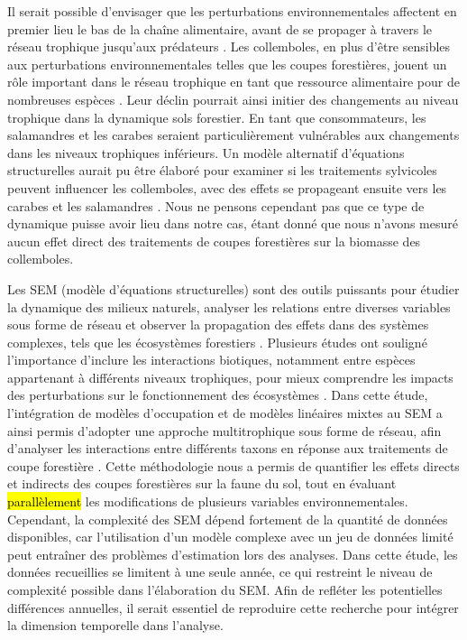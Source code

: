 Il serait possible d'envisager que les perturbations environnementales affectent en premier lieu le bas de la chaîne alimentaire, avant de se propager à travers le réseau trophique jusqu'aux prédateurs \citep{Chauvat2014Responsesoil,Laigle2021Directindirect}. 
Les collemboles, en plus d'être sensibles aux perturbations environnementales telles que les coupes forestières, jouent un rôle important dans le réseau trophique en tant que ressource alimentaire pour de nombreuses espèces \citep{Burton1975Energyflow,Bauer1982Predationcarabid,rusekBiodiversityCollembolaTheir1998,Chauvat2014Responsesoil}. 
Leur déclin pourrait ainsi initier des changements au niveau trophique dans la dynamique sols forestier.
En tant que consommateurs, les salamandres et les carabes seraient particulièrement vulnérables aux changements dans les niveaux trophiques inférieurs. 
Un modèle alternatif d'équations structurelles aurait pu être élaboré pour examiner si les traitements sylvicoles peuvent influencer les collemboles, avec des effets se propageant ensuite vers les carabes et les salamandres \citep{Laigle2021Directindirect}. 
Nous ne pensons cependant pas que ce type de dynamique puisse avoir lieu dans notre cas, étant donné que nous n'avons mesuré aucun effet direct des traitements de coupes forestières sur la biomasse des collemboles. 

Les SEM (modèle d’équations structurelles) sont des outils puissants pour étudier la dynamique des milieux naturels, analyser les relations entre diverses variables sous forme de réseau et observer la propagation des effets dans des systèmes complexes, 
tels que les écosystèmes forestiers \citep{graceSpecificationStructuralEquation2010}.  
Plusieurs études ont souligné l’importance d’inclure les interactions biotiques, notamment entre espèces appartenant à différents niveaux trophiques, pour mieux comprendre les impacts des perturbations 
sur le fonctionnement des écosystèmes \citep{Thebault2003Foodwebconstraints,Seibold2018necessitymultitrophic,Laigle2021Directindirect}.  
Dans cette étude, l’intégration de modèles d’occupation et de modèles linéaires mixtes au SEM a ainsi permis d’adopter une approche multitrophique sous forme de réseau, 
afin d’analyser les interactions entre différents taxons en réponse aux traitements de coupe forestière \citep{josephIntegratingOccupancyModels2016}.  
Cette méthodologie nous a permis de quantifier les effets directs et indirects des coupes forestières sur la faune du sol, tout en évaluant \hl{parallèlement} les modifications de plusieurs variables environnementales. 
Cependant, la complexité des SEM dépend fortement de la quantité de données disponibles, car l’utilisation d’un modèle complexe avec un jeu de données limité peut entraîner des problèmes d’estimation lors des analyses.  
Dans cette étude, les données recueillies se limitent à une seule année, ce qui restreint le niveau de complexité possible dans l'élaboration du SEM. 
Afin de refléter les potentielles différences annuelles, il serait essentiel de reproduire cette recherche pour intégrer la dimension temporelle dans l’analyse.

